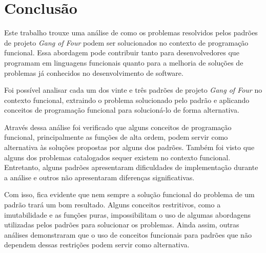 \chapter{Conclusão}


Este trabalho trouxe uma análise de como os 
problemas resolvidos pelos padrões de projeto 
\textit{Gang of Four} podem ser solucionados no 
contexto de programação funcional. Essa abordagem 
pode contribuir tanto para desenvolvedores que 
programam em linguagens funcionais quanto para a 
melhoria de soluções de problemas já conhecidos 
no desenvolvimento de software.


Foi possível analisar cada um dos vinte e 
três padrões de projeto \textit{Gang of Four} 
no contexto funcional, extraindo o problema 
solucionado pelo padrão e aplicando conceitos 
de programação funcional para solucioná-lo de 
forma alternativa.


Através dessa análise foi verificado que 
alguns conceitos de programação funcional, 
principalmente as funções de alta 
ordem, podem servir como alternativa às soluções 
propostas por alguns dos padrões. Também foi 
visto que alguns dos problemas catalogados 
sequer existem no contexto funcional. 
Entretanto, alguns padrões apresentaram 
dificuldades de implementação durante a 
análise e outros não apresentaram diferenças 
significativas.


Com isso, fica evidente que nem sempre 
a solução funcional do problema de um 
padrão trará um bom resultado. Alguns 
conceitos restritivos, como a imutabilidade 
e as funções puras, impossibilitam 
o uso de algumas abordagens utilizadas 
pelos padrões para solucionar os problemas. 
Ainda assim, outras análises demonstraram 
que o uso de conceitos funcionais para 
padrões que não dependem dessas restrições 
podem servir como alternativa. 




